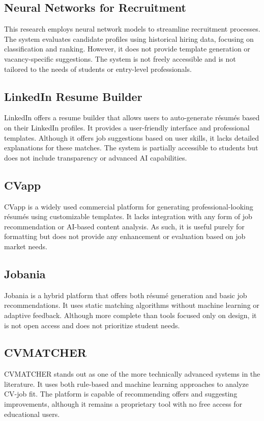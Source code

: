 \documentclass[runningheads]{llncs}
\begin{document}
	\subsection{Neural Networks for Recruitment~\cite{estadoarte4}}
	This research employs neural network models to streamline recruitment processes. The system evaluates candidate profiles using historical hiring data, focusing on classification and ranking. However, it does not provide template generation or vacancy-specific suggestions. The system is not freely accessible and is not tailored to the needs of students or entry-level professionals.
	
	\subsection{LinkedIn Resume Builder~\cite{estadoarte5}}
	LinkedIn offers a resume builder that allows users to auto-generate résumés based on their LinkedIn profiles. It provides a user-friendly interface and professional templates. Although it offers job suggestions based on user skills, it lacks detailed explanations for these matches. The system is partially accessible to students but does not include transparency or advanced AI capabilities.
	
	\subsection{CVapp~\cite{estadoarte8}}
	CVapp is a widely used commercial platform for generating professional-looking résumés using customizable templates. It lacks integration with any form of job recommendation or AI-based content analysis. As such, it is useful purely for formatting but does not provide any enhancement or evaluation based on job market needs.
	
	\subsection{Jobania~\cite{estadoarte6}}
	Jobania is a hybrid platform that offers both résumé generation and basic job recommendations. It uses static matching algorithms without machine learning or adaptive feedback. Although more complete than tools focused only on design, it is not open access and does not prioritize student needs.
	
	\subsection{CVMATCHER~\cite{estadoarte7}}
	CVMATCHER stands out as one of the more technically advanced systems in the literature. It uses both rule-based and machine learning approaches to analyze CV-job fit. The platform is capable of recommending offers and suggesting improvements, although it remains a proprietary tool with no free access for educational users.
	
\end{document}
